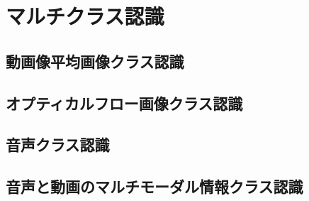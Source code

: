 \section{マルチクラス認識}
\subsection{動画像平均画像クラス認識}
\subsection{オプティカルフロー画像クラス認識}
\subsection{音声クラス認識}
\subsection{音声と動画のマルチモーダル情報クラス認識}

